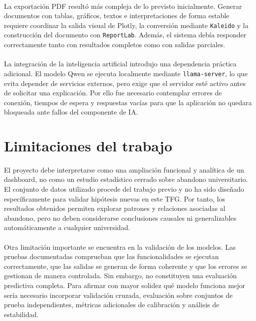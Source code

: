 \paragraph*{}La exportación PDF resultó más compleja de lo previsto inicialmente. Generar documentos con tablas, gráficos, textos e interpretaciones de forma estable requiere coordinar la salida visual de Plotly, la conversión mediante \texttt{Kaleido} y la construcción del documento con \texttt{ReportLab}. Además, el sistema debía responder correctamente tanto con resultados completos como con salidas parciales.

\paragraph*{}La integración de la inteligencia artificial introdujo una dependencia práctica adicional. El modelo Qwen se ejecuta localmente mediante \texttt{llama-server}, lo que evita depender de servicios externos, pero exige que el servidor esté activo antes de solicitar una explicación. Por ello fue necesario contemplar errores de conexión, tiempos de espera y respuestas vacías para que la aplicación no quedara bloqueada ante fallos del componente de IA.

\section{Limitaciones del trabajo}

\paragraph*{}El proyecto debe interpretarse como una ampliación funcional y analítica de un dashboard, no como un estudio estadístico cerrado sobre abandono universitario. El conjunto de datos utilizado procede del trabajo previo y no ha sido diseñado específicamente para validar hipótesis nuevas en este TFG. Por tanto, los resultados obtenidos permiten explorar patrones y relaciones asociadas al abandono, pero no deben considerarse conclusiones causales ni generalizables automáticamente a cualquier universidad.

\paragraph*{}Otra limitación importante se encuentra en la validación de los modelos. Las pruebas documentadas comprueban que las funcionalidades se ejecutan correctamente, que las salidas se generan de forma coherente y que los errores se gestionan de manera controlada. Sin embargo, no constituyen una evaluación predictiva completa. Para afirmar con mayor solidez qué modelo funciona mejor sería necesario incorporar validación cruzada, evaluación sobre conjuntos de prueba independientes, métricas adicionales de calibración y análisis de estabilidad.

